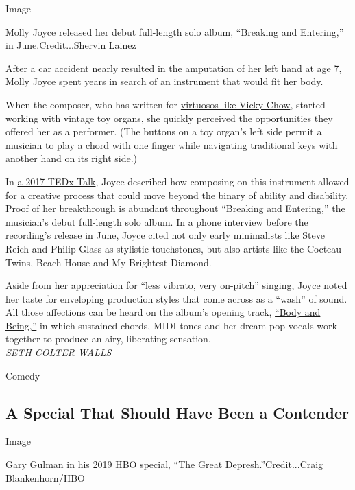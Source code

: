 Image

Molly Joyce released her debut full-length solo album, ``Breaking and
Entering,'' in June.Credit...Shervin Lainez

After a car accident nearly resulted in the amputation of her left hand
at age 7, Molly Joyce spent years in search of an instrument that would
fit her body.

When the composer, who has written for
\href{https://vickychow.bandcamp.com/track/rave-composed-by-molly-joyce}{virtuosos
like Vicky Chow}, started working with vintage toy organs, she quickly
perceived the opportunities they offered her as a performer. (The
buttons on a toy organ's left side permit a musician to play a chord
with one finger while navigating traditional keys with another hand on
its right side.)

In \href{https://www.youtube.com/watch?v=HcIavUYjRzg}{a 2017 TEDx Talk},
Joyce described how composing on this instrument allowed for a creative
process that could move beyond the binary of ability and disability.
Proof of her breakthrough is abundant throughout
\href{https://mollyjoyce.bandcamp.com/album/breaking-and-entering}{``Breaking
and Entering,''} the musician's debut full-length solo album. In a phone
interview before the recording's release in June, Joyce cited not only
early minimalists like Steve Reich and Philip Glass as stylistic
touchstones, but also artists like the Cocteau Twins, Beach House and My
Brightest Diamond.

Aside from her appreciation for ``less vibrato, very on-pitch'' singing,
Joyce noted her taste for enveloping production styles that come across
as a ``wash'' of sound. All those affections can be heard on the album's
opening track,
\href{https://mollyjoyce.bandcamp.com/track/body-and-being}{``Body and
Being,''} in which sustained chords, MIDI tones and her dream-pop vocals
work together to produce an airy, liberating sensation.\\
\emph{SETH COLTER WALLS}

Comedy

\hypertarget{a-special-that-should-have-been-a-contender}{%
\subsection{A Special That Should Have Been a
Contender}\label{a-special-that-should-have-been-a-contender}}

Image

Gary Gulman in his 2019 HBO special, ``The Great
Depresh.''Credit...Craig Blankenhorn/HBO

